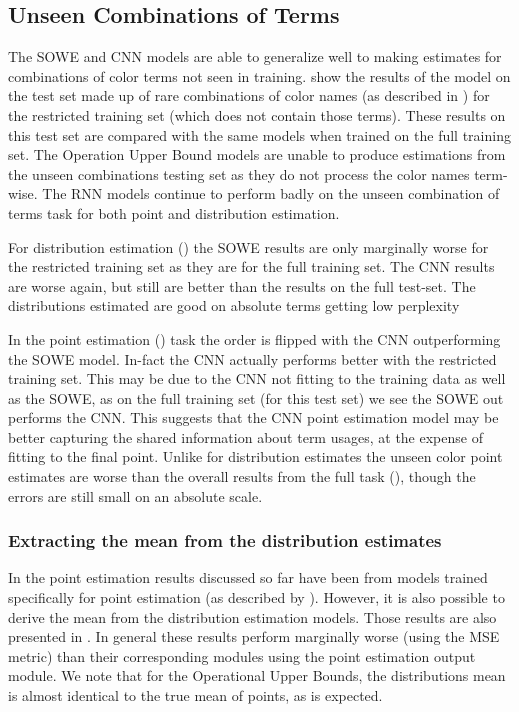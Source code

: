 \documentclass[11pt,a4paper]{article}
\begin{document}
\subsection{Unseen Combinations of Terms}
The SOWE and CNN models are able to generalize well to making estimates for combinations of color terms not seen in training.
 show the results of the model on the test set made up of rare combinations of color names (as described in ) for the restricted training set (which does not contain those terms).
These results on this test set are compared with the same models when trained on the full training set.
The Operation Upper Bound models are unable to produce estimations from the unseen combinations testing set as they do not process the color names term-wise.
The RNN models continue to perform badly on the unseen combination of terms task for both point and distribution estimation.

For distribution estimation () the SOWE results are only marginally worse for the restricted training set as they are for the full training set.
The CNN results are worse again, but still are better than the results on the full test-set.
The distributions estimated are good on absolute terms getting low perplexity

In the point estimation () task the order is flipped with the CNN outperforming the SOWE model.
In-fact the CNN actually performs better with the restricted training set.
This may be due to the CNN not fitting to the training data as well as the SOWE,
as on the full training set (for this test set) we see the SOWE out performs the CNN.
This suggests that the CNN point estimation model may be better capturing the shared information about term usages, at the expense of fitting to the final point.
Unlike for distribution estimates the unseen color point estimates are worse than the overall results from the full task (), though the errors are still small on an absolute scale.



\subsubsection{Extracting the mean from the distribution estimates}

In the point estimation results discussed so far have been from models trained specifically for point estimation (as described by ).
However, it is also possible to derive the mean from the distribution estimation models.
Those results are also presented in .
In general these results perform marginally worse (using the MSE metric) than their corresponding modules using the point estimation output module.
We note that for the Operational Upper Bounds, the distributions mean is almost identical to the true mean of points, as is expected.
\end{document}
